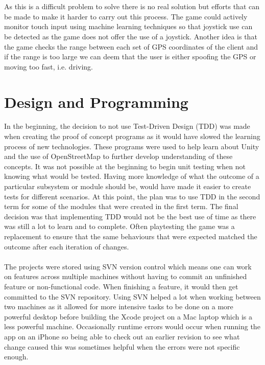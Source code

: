 \documentclass[a4paper]{report}
\begin{document}
\\\\
As this is a difficult problem to solve there is no real solution but efforts that can be made to make it harder to carry out this process. The game could actively monitor touch input using machine learning techniques so that joystick use can be detected as the game does not offer the use of a joystick. Another idea is that the game checks the range between each set of GPS coordinates of the client and if the range is too large we can deem that the user is either spoofing the GPS or moving too fast, i.e. driving. \cite{PGO}

\section{Design and Programming}
In the beginning, the decision to not use Test-Driven Design (TDD) was made when creating the proof of concept programs as it would have slowed the learning process of new technologies. These programs were used to help learn about Unity and the use of OpenStreetMap to further develop understanding of these concepts. It was not possible at the beginning to begin unit testing when not knowing what would be tested. Having more knowledge of what the outcome of a particular subsystem or module should be, would have made it easier to create tests for different scenarios. At this point, the plan was to use TDD in the second term for some of the modules that were created in the first term. The final decision was that implementing TDD would not be the best use of time as there was still a lot to learn and to complete. Often playtesting the game was a replacement to ensure that the same behaviours that were expected matched the outcome after each iteration of changes. \cite{Tdd}
\pagebreak
\\\\
The projects were stored using SVN version control which means one can work on features across multiple machines without having to commit an unfinished feature or non-functional code. When finishing a feature, it would then get committed to the SVN repository. Using SVN helped a lot when working between two machines as it allowed for more intensive tasks to be done on a more powerful desktop before building the Xcode project on a Mac laptop which is a less powerful machine. Occasionally runtime errors would occur when running the app on an iPhone so being able to check out an earlier revision to see what change caused this was sometimes helpful when the errors were not specific enough. 
\end{document}

